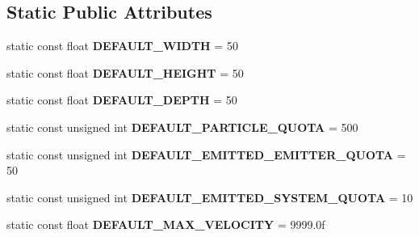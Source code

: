 \subsection*{Static Public Attributes}
\begin{DoxyCompactItemize}
\item 
\mbox{\label{classPUParticleSystem3D_ac3426433f674f5af835055bf45a46ee6}} 
static const float {\bfseries D\+E\+F\+A\+U\+L\+T\+\_\+\+W\+I\+D\+TH} = 50
\item 
\mbox{\label{classPUParticleSystem3D_ad22f86f3292091bbd4b0d8e031b4fa7a}} 
static const float {\bfseries D\+E\+F\+A\+U\+L\+T\+\_\+\+H\+E\+I\+G\+HT} = 50
\item 
\mbox{\label{classPUParticleSystem3D_af351dddf593c3765e1ba9d65034325d1}} 
static const float {\bfseries D\+E\+F\+A\+U\+L\+T\+\_\+\+D\+E\+P\+TH} = 50
\item 
\mbox{\label{classPUParticleSystem3D_ac00166153db3a6f19cca2768702f51c8}} 
static const unsigned int {\bfseries D\+E\+F\+A\+U\+L\+T\+\_\+\+P\+A\+R\+T\+I\+C\+L\+E\+\_\+\+Q\+U\+O\+TA} = 500
\item 
\mbox{\label{classPUParticleSystem3D_aa68cdf5b81996f4ce8d198926edcc778}} 
static const unsigned int {\bfseries D\+E\+F\+A\+U\+L\+T\+\_\+\+E\+M\+I\+T\+T\+E\+D\+\_\+\+E\+M\+I\+T\+T\+E\+R\+\_\+\+Q\+U\+O\+TA} = 50
\item 
\mbox{\label{classPUParticleSystem3D_a50910fd343ee8f5c554b1456a298a145}} 
static const unsigned int {\bfseries D\+E\+F\+A\+U\+L\+T\+\_\+\+E\+M\+I\+T\+T\+E\+D\+\_\+\+S\+Y\+S\+T\+E\+M\+\_\+\+Q\+U\+O\+TA} = 10
\item 
\mbox{\label{classPUParticleSystem3D_a75b2eea9938e0f368f7172a49c981102}} 
static const float {\bfseries D\+E\+F\+A\+U\+L\+T\+\_\+\+M\+A\+X\+\_\+\+V\+E\+L\+O\+C\+I\+TY} = 9999.\+0f
\end{DoxyCompactItemize}
